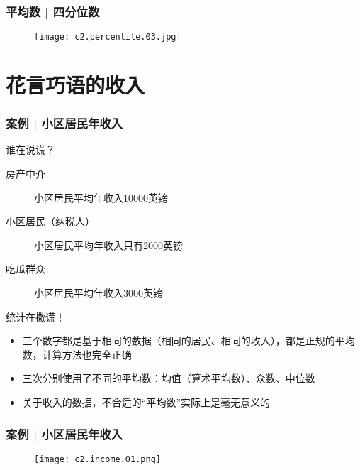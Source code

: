 \begin{frame}
  \frametitle{平均数 | 四分位数}
  \begin{figure}
    \centering
    \texttt{[image: c2.percentile.03.jpg]}
  \end{figure}
\end{frame}

\section{花言巧语的收入}
\begin{frame}
  \frametitle{案例 | 小区居民年收入}
  \begin{block}{谁在说谎？}
    \begin{description}
      \item[房产中介] 小区居民平均年收入10000英镑
      \item[小区居民（纳税人）] 小区居民平均年收入只有2000英镑
      \item[吃瓜群众] 小区居民平均年收入3000英镑
    \end{description}
  \end{block}
  \pause \pause \pause \pause
  \begin{block}{统计在撒谎！}
    \begin{itemize}
      \item 三个数字都是基于相同的数据（相同的居民、相同的收入），都是正规的平均数，计算方法也完全正确
      \item 三次分别使用了不同的平均数：均值（算术平均数）、众数、中位数
      \item 关于收入的数据，不合适的“平均数”实际上是毫无意义的
    \end{itemize}
  \end{block}
\end{frame}

\begin{frame}
  \frametitle{案例 | 小区居民年收入}
  \begin{figure}
    \centering
    \texttt{[image: c2.income.01.png]}
  \end{figure}
\end{frame}

